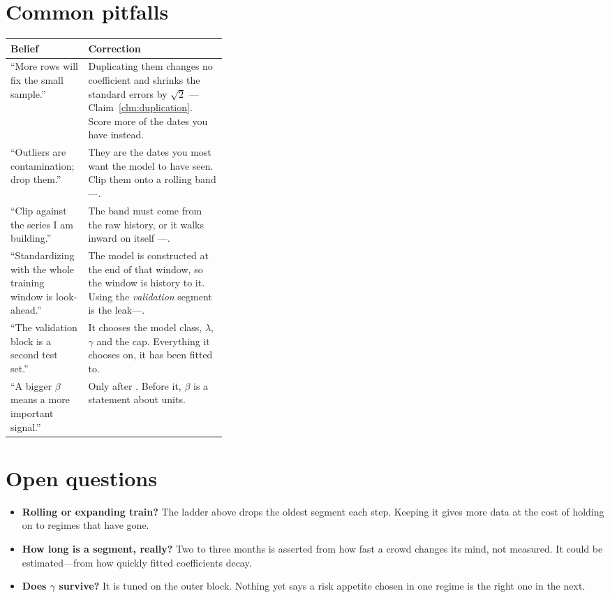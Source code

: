 \section*{Common pitfalls}

\begin{xltabular}{\linewidth}{|>{\raggedright\arraybackslash}p{0.36\linewidth}|X|}
\hline
\textbf{Belief} & \textbf{Correction} \\ \hline
\endhead
``More rows will fix the small sample.''
  & Duplicating them changes no coefficient and shrinks the standard errors by $\sqrt{2}$
    ---Claim~\ref{clm:duplication}. Score more of the dates you have instead. \\ \hline
``Outliers are contamination; drop them.''
  & They are the dates you most want the model to have seen. Clip them onto a rolling band
    ---. \\ \hline
``Clip against the series I am building.''
  & The band must come from the raw history, or it walks inward on itself
    ---. \\ \hline
``Standardizing with the whole training window is look-ahead.''
  & The model is constructed at the end of that window, so the window is history to it. Using the
    \emph{validation} segment is the leak---. \\ \hline
``The validation block is a second test set.''
  & It chooses the model class, $\lambda$, $\gamma$ and the cap. Everything it chooses on, it has
    been fitted to. \\ \hline
``A bigger $\beta$ means a more important signal.''
  & Only after . Before it, $\beta$ is a statement about units. \\ \hline
\end{xltabular}


\section*{Open questions}

\begin{itemize}
  \item \textbf{Rolling or expanding train?} The ladder above drops the oldest segment each step.
        Keeping it gives more data at the cost of holding on to regimes that have gone.
  \item \textbf{How long is a segment, really?} Two to three months is asserted from how fast a
        crowd changes its mind, not measured. It could be estimated---from how quickly fitted
        coefficients decay.
  \item \textbf{Does $\gamma$ survive?} It is tuned on the outer block. Nothing yet says a risk
        appetite chosen in one regime is the right one in the next.
\end{itemize}


